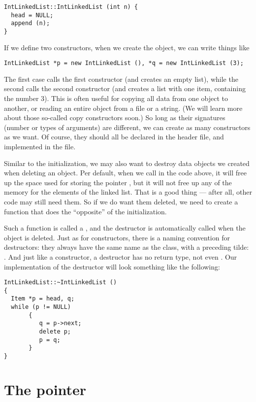 \begin{verbatim}
IntLinkedList::IntLinkedList (int n) {
  head = NULL;
  append (n);
}
\end{verbatim}

If we define two constructors, when we create the object, we can write
things like
\begin{verbatim}
IntLinkedList *p = new IntLinkedList (), *q = new IntLinkedList (3);
\end{verbatim}
The first case calls the first constructor
(and creates an empty list),
while the second calls the second constructor
(and creates a list with one item, containing the number 3).
This is often useful for copying all data from one object to another,
or reading an entire object from a file or a string.
(We will learn more about those so-called copy constructors soon.)
So long as their signatures (number or types of arguments) are
different, we can create as many constructors as we want.
Of course, they should all be declared in the header file, and
implemented in the  file.

Similar to the initialization, we may also want to destroy data
objects we created when deleting an object.
Per default, when we call  in the code above,
it will free up the space used for storing the pointer ,
but it will not free up any of the memory for the elements of the linked list. 
That is a good thing --- after all, other code may still need them.
So if we do want them deleted, we need to create a function that does
the ``opposite'' of the initialization.

Such a function is called a ,
and the destructor is automatically called when the object is deleted. 
Just as for constructors, there is a naming convention for destructors:
they always have the same name as the class, with a preceding tilde:
.
And just like a constructor, a destructor has no return type, not even
.
Our implementation of the destructor will look something like the
following:

\begin{verbatim}
IntLinkedList::~IntLinkedList ()
{ 
  Item *p = head, q;
  while (p != NULL)
       {
          q = p->next;
          delete p;
          p = q;
       }  
}
\end{verbatim}

\section{The  pointer}

